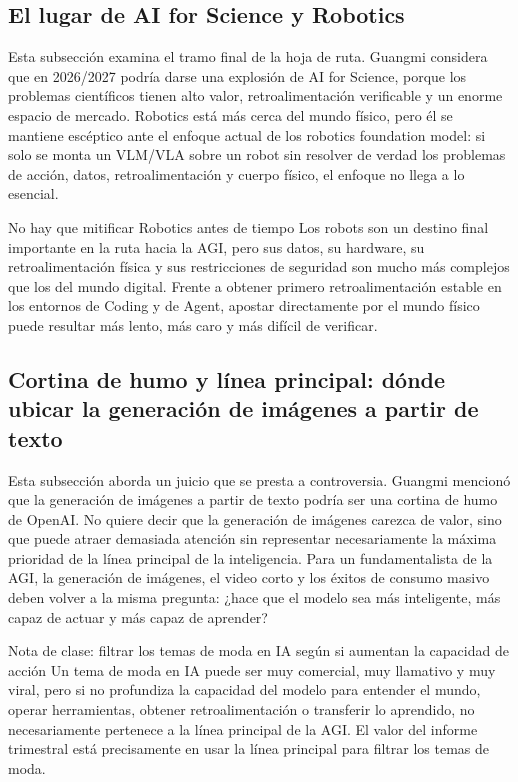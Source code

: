 \documentclass[a4paper]{article}
\begin{document}
\subsection{El lugar de AI for Science y Robotics}

Esta subsección examina el tramo final de la hoja de ruta. Guangmi considera que en 2026/2027 podría darse una explosión de AI for Science, porque los problemas científicos tienen alto valor, retroalimentación verificable y un enorme espacio de mercado. Robotics está más cerca del mundo físico, pero él se mantiene escéptico ante el enfoque actual de los robotics foundation model: si solo se monta un VLM/VLA sobre un robot sin resolver de verdad los problemas de acción, datos, retroalimentación y cuerpo físico, el enfoque no llega a lo esencial.

\begin{warningbox}{No hay que mitificar Robotics antes de tiempo}
Los robots son un destino final importante en la ruta hacia la AGI, pero sus datos, su hardware, su retroalimentación física y sus restricciones de seguridad son mucho más complejos que los del mundo digital. Frente a obtener primero retroalimentación estable en los entornos de Coding y de Agent, apostar directamente por el mundo físico puede resultar más lento, más caro y más difícil de verificar.
\end{warningbox}

\subsection{Cortina de humo y línea principal: dónde ubicar la generación de imágenes a partir de texto}

Esta subsección aborda un juicio que se presta a controversia. Guangmi mencionó que la generación de imágenes a partir de texto podría ser una cortina de humo de OpenAI. No quiere decir que la generación de imágenes carezca de valor, sino que puede atraer demasiada atención sin representar necesariamente la máxima prioridad de la línea principal de la inteligencia. Para un fundamentalista de la AGI, la generación de imágenes, el video corto y los éxitos de consumo masivo deben volver a la misma pregunta: ¿hace que el modelo sea más inteligente, más capaz de actuar y más capaz de aprender?

\begin{knowledgebox}{Nota de clase: filtrar los temas de moda en IA según si aumentan la capacidad de acción}
Un tema de moda en IA puede ser muy comercial, muy llamativo y muy viral, pero si no profundiza la capacidad del modelo para entender el mundo, operar herramientas, obtener retroalimentación o transferir lo aprendido, no necesariamente pertenece a la línea principal de la AGI. El valor del informe trimestral está precisamente en usar la línea principal para filtrar los temas de moda.
\end{knowledgebox}
\end{document}
